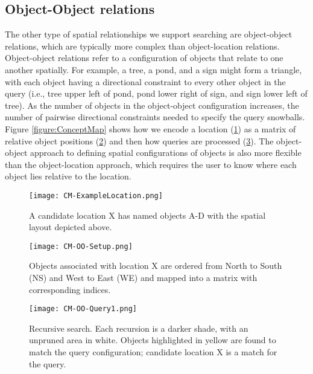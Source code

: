 \subsection{Object-Object relations}
The other type of spatial relationships we support searching are object-object relations, which are typically more complex than object-location relations.
Object-object relations refer to a configuration of objects that relate to one another spatially.
For example, a tree, a pond, and a sign might form a triangle, with each object having a directional constraint to every other object in the query (i.e., tree upper left of pond, pond lower right of sign, and sign lower left of tree).
As the number of objects in the object-object configuration increases, the number of pairwise directional constraints needed to specify the query snowballs. 
Figure \ref{figure:ConceptMap} shows how we encode a location (\ref{fig:CM-Example}) as a matrix of relative object positions (\ref{fig:CM-OO-Setup}) and then how queries are processed (\ref{fig:CM-OO-Query}).
The object-object approach to defining spatial configurations of objects is also more flexible than the object-location approach, which requires the user to know where each object lies relative to the location. 



\begin{figure*}[h]
    \centering
    \begin{subfigure}[t]{.25\textwidth}
        \texttt{[image: CM-ExampleLocation.png]}
        \caption{\small A candidate location X has named objects A-D with the spatial layout depicted above.}
        \label{fig:CM-Example}
    \end{subfigure}
    \hfill
    \begin{subfigure}[t]{.25\textwidth}
        \texttt{[image: CM-OO-Setup.png]}
        \caption{\small Objects associated with location X are ordered from North to South (NS) and West to East (WE) and mapped into a matrix with corresponding indices.}
        \label{fig:CM-OO-Setup}
    \end{subfigure}
    \hfill
        \begin{subfigure}[t]{.25\textwidth}
        \texttt{[image: CM-OO-Query1.png]}
        \caption{\small Recursive search. Each recursion is a darker shade, with an unpruned area in white. Objects highlighted in yellow are found to match the query configuration; candidate location X is a match for the query.}
        \label{fig:CM-OO-Query}
    \hfill
    \end{subfigure}
    \caption{\textbf{Object-Object Search Method. A Concept Map data structure (Figure \ref{fig:CM-OO-Setup}) is generated by ordering the objects associated with a candidate location (Figure \ref{fig:CM-Example}) from North to South and West to East. The search step (Figure \ref{fig:CM-OO-Query}) then recursively prunes the concept map until ANY matching configuration of objects is identified or the query constraints are not satisfied.
    }}\label{figure:ConceptMap} 
\end{figure*}

